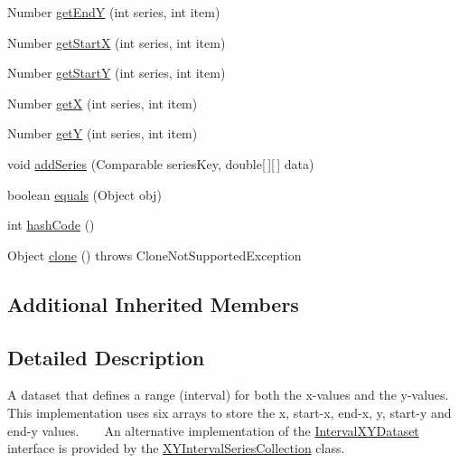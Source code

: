 \begin{DoxyCompactItemize}
Number \mbox{\hyperlink{classorg_1_1jfree_1_1data_1_1xy_1_1_default_interval_x_y_dataset_aed7774df9c641523b66b02e176b813ed}{get\+EndY}} (int series, int item)
\item 
Number \mbox{\hyperlink{classorg_1_1jfree_1_1data_1_1xy_1_1_default_interval_x_y_dataset_af1221379a4ac6d470d0b901b80841940}{get\+StartX}} (int series, int item)
\item 
Number \mbox{\hyperlink{classorg_1_1jfree_1_1data_1_1xy_1_1_default_interval_x_y_dataset_ad9406f2afbf209d346903c0a004f4aad}{get\+StartY}} (int series, int item)
\item 
Number \mbox{\hyperlink{classorg_1_1jfree_1_1data_1_1xy_1_1_default_interval_x_y_dataset_a73bb4e27acf510ab125c2a2c1fb4020a}{getX}} (int series, int item)
\item 
Number \mbox{\hyperlink{classorg_1_1jfree_1_1data_1_1xy_1_1_default_interval_x_y_dataset_a5085de7f01a34d6599e275e3151c0e1c}{getY}} (int series, int item)
\item 
void \mbox{\hyperlink{classorg_1_1jfree_1_1data_1_1xy_1_1_default_interval_x_y_dataset_a030b9257e8bce1b3009dff887d0afce4}{add\+Series}} (Comparable series\+Key, double\mbox{[}$\,$\mbox{]}\mbox{[}$\,$\mbox{]} data)
\item 
boolean \mbox{\hyperlink{classorg_1_1jfree_1_1data_1_1xy_1_1_default_interval_x_y_dataset_a2ec3c43540e74602206cd5b5c649c0b9}{equals}} (Object obj)
\item 
int \mbox{\hyperlink{classorg_1_1jfree_1_1data_1_1xy_1_1_default_interval_x_y_dataset_a4bb98970a5ea754b721413cd01e8e5be}{hash\+Code}} ()
\item 
Object \mbox{\hyperlink{classorg_1_1jfree_1_1data_1_1xy_1_1_default_interval_x_y_dataset_afa1ba47d8ed4807303769ba45afb4ad4}{clone}} ()  throws Clone\+Not\+Supported\+Exception 
\end{DoxyCompactItemize}
\subsection*{Additional Inherited Members}


\subsection{Detailed Description}
A dataset that defines a range (interval) for both the x-\/values and the y-\/values. This implementation uses six arrays to store the x, start-\/x, end-\/x, y, start-\/y and end-\/y values. ~\newline
~\newline
 An alternative implementation of the \mbox{\hyperlink{interfaceorg_1_1jfree_1_1data_1_1xy_1_1_interval_x_y_dataset}{Interval\+X\+Y\+Dataset}} interface is provided by the \mbox{\hyperlink{classorg_1_1jfree_1_1data_1_1xy_1_1_x_y_interval_series_collection}{X\+Y\+Interval\+Series\+Collection}} class.

